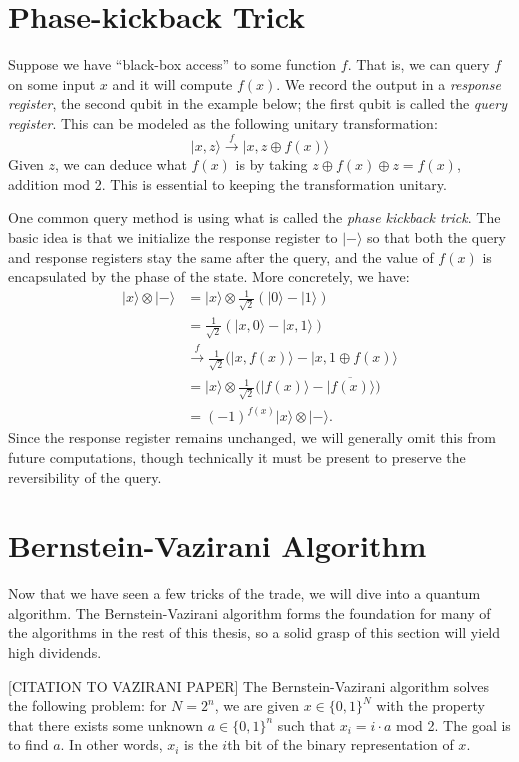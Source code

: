 \documentclass[12pt,twoside]{reedthesis}
\newcommand{\ketz}{\ensuremath{\lvert 0\rangle}\xspace}
\newcommand{\keto}{\ensuremath{\lvert 1\rangle}\xspace}
\newcommand{\ket}[1]{\ensuremath{\lvert #1\rangle}\xspace}
\newcommand{\Hminus}{\ensuremath{\lvert- \rangle}\xspace}
\begin{document}
\section{Phase-kickback Trick}

Suppose we have ``black-box access'' to some function $f$. That is, we can query $f$ on some input $x$ and it will compute $f(x)$. We record the output in a \textit{response register}, the second qubit in the example below; the first qubit is called the \textit{query register}. This can be modeled as the following unitary transformation:
\begin{equation*}
\ket{x, z} \xrightarrow{f} \ket{x, z \oplus f(x)}
\end{equation*}
Given $z$, we can deduce what $f(x)$ is by taking $z \oplus f(x) \oplus z = f(x)$, addition mod 2. This is essential to keeping the transformation unitary. 

One common query method is using what is called the \textit{phase kickback trick}. The basic idea is that we initialize the response register to \Hminus so that both the query and response registers stay the same after the query, and the value of $f(x)$ is encapsulated by the phase of the state. More concretely, we have:
\begin{align*}
\ket{x} \otimes \Hminus 
& = \ket{x} \otimes \frac{1}{\sqrt{2}}(\ketz - \keto)\\
& = \frac{1}{\sqrt{2}}(\ket{x, 0} - \ket{x, 1}) \\
& \xrightarrow{f} \frac{1}{\sqrt{2}}(\ket{x, f(x)} - \ket{x, 1 \oplus f(x)} \\
& = \ket{x} \otimes \frac{1}{\sqrt{2}}\bigg(\ket{f(x)} - \ket{\overline{f(x)}}\bigg) \\
& = (-1)^{f(x)} \ket{x} \otimes \ket{ -}.
\end{align*}
Since the response register remains unchanged, we will generally omit this from future computations, though technically it must be present to preserve the reversibility of the query. 
\section{Bernstein-Vazirani Algorithm}

Now that we have seen a few tricks of the trade, we will dive into a quantum algorithm. The Bernstein-Vazirani algorithm forms the foundation for many of the algorithms in the rest of this thesis, so a solid grasp of this section will yield high dividends. 

[CITATION TO VAZIRANI PAPER] The Bernstein-Vazirani algorithm solves the following problem: for $N = 2^n$, we are given $x \in \{0,1\}^N$ with the property that there exists some unknown $a \in \{0,1\}^n$ such that $x_i = i \cdot a$ mod 2. The goal is to find $a$. In other words, $x_i$ is the $i$th bit of the binary representation of $x$. 
\end{document}
